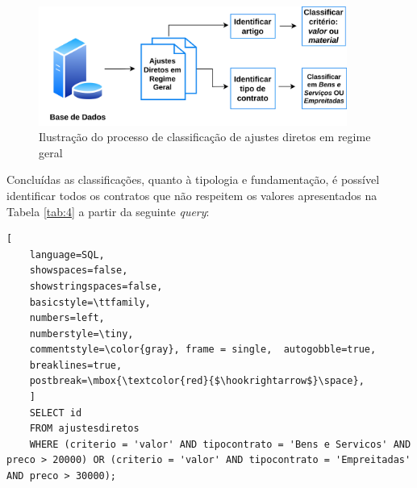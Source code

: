 \begin{figure}[H]
	\centering
	\includegraphics[width=0.9\textwidth]{imagens/rf1.png}
	\caption{Ilustração do processo de classificação de ajustes diretos em regime geral}
	\label{}
\end{figure}

%	

%	
%	


Concluídas as classificações, quanto à tipologia e fundamentação, é possível identificar todos os contratos que não respeitem os valores apresentados na Tabela \ref{tab:4} a partir da seguinte \textit{query}: 

\clearpage

\begin{lstlisting}[
	language=SQL,
	showspaces=false,
	showstringspaces=false,
	basicstyle=\ttfamily,
	numbers=left,
	numberstyle=\tiny,
	commentstyle=\color{gray}, frame = single,	autogobble=true,
	breaklines=true,
	postbreak=\mbox{\textcolor{red}{$\hookrightarrow$}\space},
	]
	SELECT id
	FROM ajustesdiretos
	WHERE (criterio = 'valor' AND tipocontrato = 'Bens e Servicos' AND preco > 20000) OR (criterio = 'valor' AND tipocontrato = 'Empreitadas' AND preco > 30000);
\end{lstlisting}

